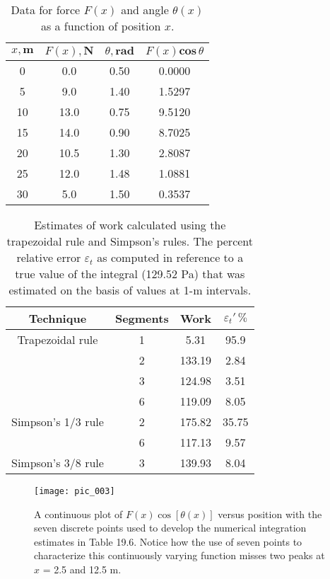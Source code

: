 \documentclass[../main.tex]{subfiles}
\begin{document}
\begin{table}[htb!]
\centering
\caption{Data for force $F(x)$ and angle $\theta(x)$ as a function of
position $x$.}
\def\arraystretch{1.2}
\setlength{\tabcolsep}{36pt}
\begin{tabular}{cccc}
	\hline
	$x, \textbf{m}$ & $F(x),\textbf{N}$ &  $\theta, \textbf{rad}$ & $F(x) \textbf{cos}\, \theta$\\ \hline
	0 & 0.0 & 0.50 & 0.0000\\
	5 & 9.0 & 1.40 & 1.5297\\
	10 & 13.0 & 0.75 & 9.5120\\
	15 & 14.0 & 0.90 & 8.7025\\
	20 & 10.5 & 1.30 & 2.8087\\
	25 & 12.0 & 1.48 & 1.0881\\
	30 & 5.0 & 1.50 & 0.3537\\ \hline
\end{tabular}
\end{table}

\pagebreak

\begin{table}[htb!]
\centering
\caption{Estimates of work calculated using the trapezoidal rule and
Simpson's rules. The percent relative error $\varepsilon_t$ as computed in
reference to a true value of the integral (129.52 Pa) that was
estimated on the basis of values at 1-m intervals.}
\def\arraystretch{1.2}
\setlength{\tabcolsep}{36pt}
\begin{tabular}{cccc}
	\hline
	\textbf{Technique} & \textbf{Segments} &  \textbf{Work} & $\varepsilon_t' \,\%$\\ \hline
	Trapezoidal rule & 1 & 5.31 & 95.9\\
	 & 2 & 133.19 & 2.84\\
	 & 3 & 124.98 & 3.51\\
	 & 6 & 119.09 & 8.05\\
	Simpson's 1/3 rule & 2 & 175.82 & 35.75\\
	 & 6 & 117.13 & 9.57\\
	Simpson's 3/8 rule & 3 & 139.93 & 8.04\\ \hline
\end{tabular}
\end{table}

\vspace{0.5 in}

\begin{figure}[hbt!]
	\centering
	\texttt{[image: pic\_003]}
	\caption{\textsf{A continuous plot of $F(x) \cos [\theta(x)]$ versus position with the seven discrete points used to develop
the numerical integration estimates in Table 19.6. Notice how the use of seven points to
characterize this continuously varying function misses two peaks at $x$ = 2.5 and 12.5 m.}} 
	\label{pic.003}
\end{figure}
\end{document}
